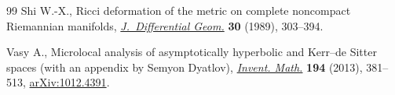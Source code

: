 \documentclass[11pt]{article}
\numberwithin{equation}{section}
\begin{document}
\begin{thebibliography}{99}
Shi W.-X., Ricci deformation of the metric on complete noncompact {R}iemannian
 manifolds, \href{https://doi.org/10.4310/jdg/1214443595}{\textit{J.~Differential Geom.}} \textbf{30} (1989), 303--394.

Vasy A., Microlocal analysis of asymptotically hyperbolic and {K}err--de
 {S}itter spaces (with an appendix by {S}emyon {D}yatlov), \href{https://doi.org/10.1007/s00222-012-0446-8}{\textit{Invent.
 Math.}} \textbf{194} (2013), 381--513, \href{https://arxiv.org/abs/1012.4391}{arXiv:1012.4391}.

\end{thebibliography}
\end{document}
